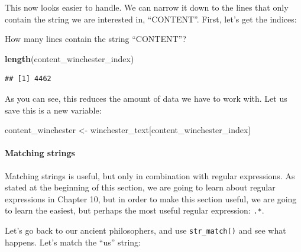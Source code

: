 \documentclass[]{gitbook}
\newenvironment{Shaded}{\begin{snugshade}}{\end{snugshade}}
\newcommand{\KeywordTok}[1]{\textcolor[rgb]{0.13,0.29,0.53}{\textbf{#1}}}
\newcommand{\NormalTok}[1]{#1}
\newcommand{\OperatorTok}[1]{\textcolor[rgb]{0.81,0.36,0.00}{\textbf{#1}}}
\newcommand{\StringTok}[1]{\textcolor[rgb]{0.31,0.60,0.02}{#1}}
\let\oldparagraph\paragraph
\renewcommand{\paragraph}[1]{\oldparagraph{#1}\mbox{}}
\begin{document}
This now looks easier to handle. We can narrow it down to the lines that only contain the string
we are interested in, ``CONTENT''. First, let's get the indices:

\begin{Shaded}
\end{Shaded}

How many lines contain the string ``CONTENT''?

\begin{Shaded}
\begin{Highlighting}[]
\KeywordTok{length}\NormalTok{(content_winchester_index)}
\end{Highlighting}
\end{Shaded}

\begin{verbatim}
## [1] 4462
\end{verbatim}

As you can see, this reduces the amount of data we have to work with. Let us save this is a new
variable:

\begin{Shaded}
\begin{Highlighting}[]
\NormalTok{content_winchester <-}\StringTok{ }\NormalTok{winchester_text[content_winchester_index]}
\end{Highlighting}
\end{Shaded}

\hypertarget{matching-strings}{%
\paragraph{Matching strings}\label{matching-strings}}

Matching strings is useful, but only in combination with regular expressions. As stated at the
beginning of this section, we are going to learn about regular expressions in Chapter 10, but in
order to make this section useful, we are going to learn the easiest, but perhaps the most useful
regular expression: \texttt{.*}.

Let's go back to our ancient philosophers, and use \texttt{str\_match()} and see what happens. Let's match
the ``us'' string:

\begin{Shaded}
\end{Shaded}
\end{document}
